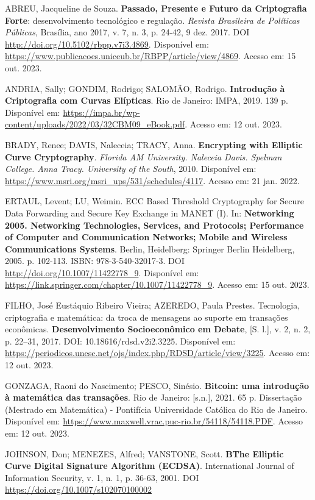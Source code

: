 ABREU, Jacqueline de Souza. \textbf{Passado, Presente e Futuro da Criptografia
    Forte}: desenvolvimento tecnológico e regulação. \textit{Revista Brasileira de
    Políticas Públicas}, Brasília, ano 2017, v. 7, n. 3, p. 24-42, 9 dez. 2017. DOI
\url{http://doi.org/10.5102/rbpp.v7i3.4869}. Disponível em:
\url{https://www.publicacoes.uniceub.br/RBPP/article/view/4869}. Acesso em: 15
out. 2023.

ANDRIA, Sally; GONDIM, Rodrigo; SALOMÃO, Rodrigo. \textbf{Introdução à
    Criptografia com Curvas Elípticas}. Rio de Janeiro: IMPA, 2019. 139 p.
Disponível em:
\url{https://impa.br/wp-content/uploads/2022/03/32CBM09_eBook.pdf}. Acesso em:
12 out. 2023.

BRADY, Renee; DAVIS, Naleceia; TRACY, Anna. \textbf{Encrypting with Elliptic
    Curve Cryptography}. \textit{Florida AM University. Naleceia Davis. Spelman
    College. Anna Tracy. University of the South}, 2010. Disponível em:
\url{https://www.msri.org/msri_ups/531/schedules/4117}. Acesso em: 21 jan.
2022.

ERTAUL, Levent; LU, Weimin. ECC Based Threshold Cryptography for Secure Data
Forwarding and Secure Key Exchange in MANET (I). In: \textbf{Networking 2005.
    Networking Technologies, Services, and Protocols; Performance of Computer and
    Communication Networks; Mobile and Wireless Communications Systems}. Berlin,
Heidelberg: Springer Berlin Heidelberg, 2005. p. 102-113. ISBN:
978-3-540-32017-3. DOI \url{http://doi.org/10.1007/11422778_9}. Disponível em:
\url{https://link.springer.com/chapter/10.1007/11422778_9}. Acesso em: 15 out.
2023.

FILHO, José Eustáquio Ribeiro Vieira; AZEREDO, Paula Prestes. Tecnologia,
criptografia e matemática: da troca de mensagens ao suporte em transações
econômicas. \textbf{Desenvolvimento Socioeconômico em Debate}, [S. l.], v. 2,
n. 2, p. 22–31, 2017. DOI: 10.18616/rdsd.v2i2.3225. Disponível em:
\url{https://periodicos.unesc.net/ojs/index.php/RDSD/article/view/3225}. Acesso
em: 12 out. 2023.

GONZAGA, Raoni do Nascimento; PESCO, Sinésio. \textbf{Bitcoin: uma introdução à
    matemática das transações}. Rio de Janeiro: [s.n.], 2021. 65 p. Dissertação
(Mestrado em Matemática) - Pontifícia Universidade Católica do Rio de Janeiro.
Disponível em: \url{https://www.maxwell.vrac.puc-rio.br/54118/54118.PDF}.
Acesso em: 12 out. 2023.

JOHNSON, Don; MENEZES, Alfred; VANSTONE, Scott. \textbf{BThe Elliptic Curve
    Digital Signature Algorithm (ECDSA)}. International Journal of Information
Security, v. 1, n. 1, p. 36-63, 2001. DOI
\url{https://doi.org/10.1007/s102070100002}

